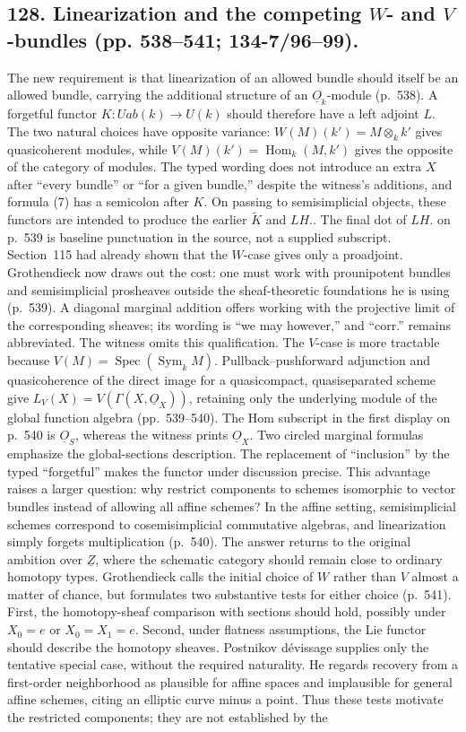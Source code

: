 \documentclass[10pt,oneside]{book}
\begin{document}
\subsection*{128. Linearization and the competing $W$- and $V$-bundles (pp. 538--541; 134-7/96--99).}
The new requirement is that linearization of an allowed bundle should itself be an allowed bundle, carrying the additional structure of an $\underline O_k$-module (p.~538). A forgetful functor $K:Uab(k)\to U(k)$ should therefore have a left adjoint $L$. The two natural choices have opposite variance: $W(M)(k')=M\otimes_k k'$ gives quasicoherent modules, while $V(M)(k')=\operatorname{Hom}_k(M,k')$ gives the opposite of the category of modules. The typed wording does not introduce an extra $X$ after ``every bundle'' or ``for a given bundle,'' despite the witness's additions, and formula (7) has a semicolon after $K$. On passing to semisimplicial objects, these functors are intended to produce the earlier $\widetilde K$ and $LH.$. The final dot of $LH.$ on p.~539 is baseline punctuation in the source, not a supplied subscript. Section~115 had already shown that the $W$-case gives only a proadjoint. Grothendieck now draws out the cost: one must work with prounipotent bundles and semisimplicial prosheaves outside the sheaf-theoretic foundations he is using (p.~539). A diagonal marginal addition offers working with the projective limit of the corresponding sheaves; its wording is ``we may however,'' and ``corr.'' remains abbreviated. The witness omits this qualification. The $V$-case is more tractable because $V(M)=\operatorname{Spec}(\operatorname{Sym}_kM)$. Pullback--pushforward adjunction and quasicoherence of the direct image for a quasicompact, quasiseparated scheme give $L_V(X)=V(\Gamma(X,\underline O_X))$, retaining only the underlying module of the global function algebra (pp.~539--540). The Hom subscript in the first display on p.~540 is $\underline O_S$, whereas the witness prints $\underline O_X$. Two circled marginal formulas emphasize the global-sections description. The replacement of ``inclusion'' by the typed ``forgetful'' makes the functor under discussion precise. This advantage raises a larger question: why restrict components to schemes isomorphic to vector bundles instead of allowing all affine schemes? In the affine setting, semisimplicial schemes correspond to cosemisimplicial commutative algebras, and linearization simply forgets multiplication (p.~540). The answer returns to the original ambition over $\underline Z$, where the schematic category should remain close to ordinary homotopy types. Grothendieck calls the initial choice of $W$ rather than $V$ almost a matter of chance, but formulates two substantive tests for either choice (p.~541). First, the homotopy-sheaf comparison with sections should hold, possibly under $X_0=e$ or $X_0=X_1=e$. Second, under flatness assumptions, the Lie functor should describe the homotopy sheaves. Postnikov d\'evissage supplies only the tentative special case, without the required naturality. He regards recovery from a first-order neighborhood as plausible for affine spaces and implausible for general affine schemes, citing an elliptic curve minus a point. Thus these tests motivate the restricted components; they are not established by the 
\end{document}
